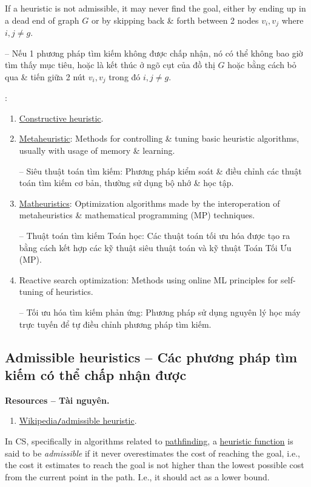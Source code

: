\documentclass{article}
\begin{document}
If a heuristic is not admissible, it may never find the goal, either by ending up in a dead end of graph $G$ or by skipping back \& forth between 2 nodes $v_i,v_j$ where $i,j\ne g$.

-- Nếu 1 phương pháp tìm kiếm không được chấp nhận, nó có thể không bao giờ tìm thấy mục tiêu, hoặc là kết thúc ở ngõ cụt của đồ thị $G$ hoặc bằng cách bỏ qua \& tiến giữa 2 nút $v_i,v_j$ trong đó $i,j\ne g$.

:
\begin{enumerate}
	\item \href{https://en.wikipedia.org/wiki/Constructive_heuristic}{Constructive heuristic}.
	\item \href{https://en.wikipedia.org/wiki/Metaheuristic}{Metaheuristic}: Methods for controlling \& tuning basic heuristic algorithms, usually with usage of memory \& learning.
	
	-- Siêu thuật toán tìm kiếm: Phương pháp kiểm soát \& điều chỉnh các thuật toán tìm kiếm cơ bản, thường sử dụng bộ nhớ \& học tập.
	\item \href{https://en.wikipedia.org/wiki/Matheuristics}{Matheuristics}: Optimization algorithms made by the interoperation of metaheuristics \& mathematical programming (MP) techniques.
	
	-- Thuật toán tìm kiếm Toán học: Các thuật toán tối ưu hóa được tạo ra bằng cách kết hợp các kỹ thuật siêu thuật toán và kỹ thuật Toán Tối Ưu (MP).
	\item Reactive search optimization: Methods using online ML principles for self-tuning of heuristics.
	
	-- Tối ưu hóa tìm kiếm phản ứng: Phương pháp sử dụng nguyên lý học máy trực tuyến để tự điều chỉnh phương pháp tìm kiếm.
\end{enumerate}


\subsection{Admissible heuristics -- Các phương pháp tìm kiếm có thể chấp nhận được}
\textbf{\textsf{Resources -- Tài nguyên.}}
\begin{enumerate}
	\item \href{https://en.wikipedia.org/wiki/Admissible_heuristic}{Wikipedia{\tt/}admissible heuristic}.
\end{enumerate}
In CS, specifically in algorithms related to \href{https://en.wikipedia.org/wiki/Pathfinding}{pathfinding}, a \href{https://en.wikipedia.org/wiki/Heuristic_function}{heuristic function} is said to be {\it admissible} if it never overestimates the cost of reaching the goal, i.e., the cost it estimates to reach the goal is not higher than the lowest possible cost from the current point in the path. I.e., it should act as a lower bound.
\end{document}
